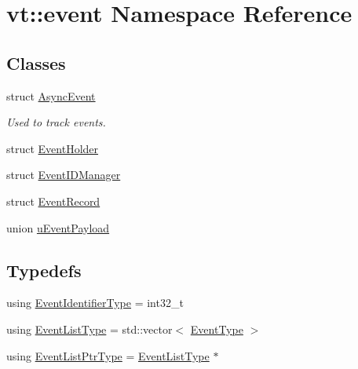 \hypertarget{namespacevt_1_1event}{}\section{vt\+:\+:event Namespace Reference}
\label{namespacevt_1_1event}
\subsection*{Classes}
\begin{DoxyCompactItemize}
\item 
struct \hyperlink{structvt_1_1event_1_1_async_event}{Async\+Event}
\begin{DoxyCompactList}\small\item\em Used to track events. \end{DoxyCompactList}\item 
struct \hyperlink{structvt_1_1event_1_1_event_holder}{Event\+Holder}
\item 
struct \hyperlink{structvt_1_1event_1_1_event_i_d_manager}{Event\+I\+D\+Manager}
\item 
struct \hyperlink{structvt_1_1event_1_1_event_record}{Event\+Record}
\item 
union \hyperlink{unionvt_1_1event_1_1u_event_payload}{u\+Event\+Payload}
\end{DoxyCompactItemize}
\subsection*{Typedefs}
\begin{DoxyCompactItemize}
\item 
using \hyperlink{namespacevt_1_1event_a0893245b7a220f3fe6951382e3038afa}{Event\+Identifier\+Type} = int32\+\_\+t
\item 
using \hyperlink{namespacevt_1_1event_a7b4d125173ad6453b505d06927581933}{Event\+List\+Type} = std\+::vector$<$ \hyperlink{namespacevt_a009267401def7ae8bf201892222d060f}{Event\+Type} $>$
\item 
using \hyperlink{namespacevt_1_1event_aa507caad8ea8ee959ccef2d57753dceb}{Event\+List\+Ptr\+Type} = \hyperlink{namespacevt_1_1event_a7b4d125173ad6453b505d06927581933}{Event\+List\+Type} $\ast$
\end{DoxyCompactItemize}

